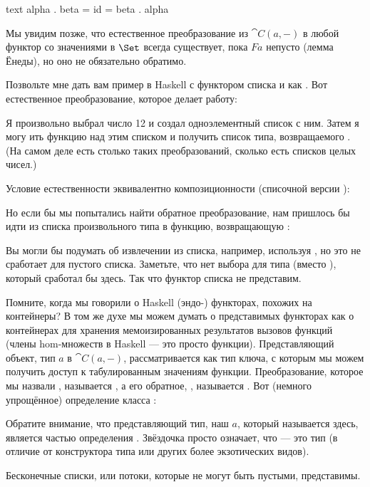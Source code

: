 \begin{snip}{text}
alpha . beta = id = beta . alpha
\end{snip}
Мы увидим позже, что естественное преобразование из $\cat{C}(a, -)$
в любой функтор со значениями в $\Set$ всегда существует, пока $F a$
непусто (лемма Ёнеды), но оно не обязательно обратимо.

Позвольте мне дать вам пример в Haskell с функтором списка и
 как . Вот естественное преобразование, которое делает
работу:

Я произвольно выбрал число 12 и создал одноэлементный список
с ним. Затем я могу ить функцию  над этим списком
и получить список типа, возвращаемого . (На самом деле
есть столько таких преобразований, сколько есть списков целых чисел.)

Условие естественности эквивалентно композиционности
 (списочной версии ):

Но если бы мы попытались найти обратное преобразование, нам пришлось бы идти
из списка произвольного типа  в функцию, возвращающую
:

Вы могли бы подумать об извлечении  из списка, например, используя
, но это не сработает для пустого списка. Заметьте, что нет
выбора для типа  (вместо ), который
сработал бы здесь. Так что функтор списка не представим.

Помните, когда мы говорили о Haskell (эндо-) функторах, похожих на
контейнеры? В том же духе мы можем думать о представимых функторах
как о контейнерах для хранения мемоизированных результатов вызовов функций (члены
hom-множеств в Haskell --- это просто функции). Представляющий
объект, тип $a$ в $\cat{C}(a, -)$, рассматривается как
тип ключа, с которым мы можем получить доступ к табулированным значениям функции.
Преобразование, которое мы назвали , называется , а его
обратное, , называется . Вот (немного упрощённое)
определение класса :

Обратите внимание, что представляющий тип, наш $a$, который называется
 здесь, является частью определения
. Звёздочка просто означает, что  --- это
тип (в отличие от конструктора типа или других более экзотических видов).

Бесконечные списки, или потоки, которые не могут быть пустыми, представимы.

